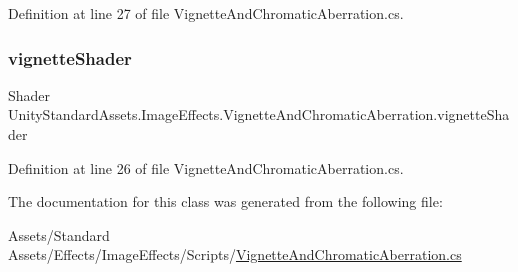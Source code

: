 Definition at line 27 of file Vignette\+And\+Chromatic\+Aberration.\+cs.

\mbox{\label{class_unity_standard_assets_1_1_image_effects_1_1_vignette_and_chromatic_aberration_a50e8b2c6fce44601d55142dbd9eb3c2b}} 
\subsubsection{\texorpdfstring{vignette\+Shader}{vignetteShader}}
{\footnotesize\ttfamily Shader Unity\+Standard\+Assets.\+Image\+Effects.\+Vignette\+And\+Chromatic\+Aberration.\+vignette\+Shader}



Definition at line 26 of file Vignette\+And\+Chromatic\+Aberration.\+cs.



The documentation for this class was generated from the following file\+:\begin{DoxyCompactItemize}
\item 
Assets/\+Standard Assets/\+Effects/\+Image\+Effects/\+Scripts/\mbox{\hyperlink{_vignette_and_chromatic_aberration_8cs}{Vignette\+And\+Chromatic\+Aberration.\+cs}}\end{DoxyCompactItemize}
